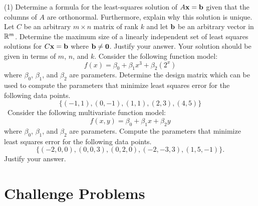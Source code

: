\begin{tasks}[resume, style=enumerate](1)
\task
  Determine a formula for the least-squares solution of $A\mathbf x = \mathbf b$
  given that the columns of $A$ are orthonormal.  Furthermore, explain
  why this solution is unique.
\task
  Let $C$ be an arbitrary $m \times n$ matrix of rank $k$ and let
  $\mathbf b$ be an arbitrary vector in $\mathbb R^m$.  Determine the maximum
  size of a linearly independent set of least squares solutions for
  $C\mathbf x = \mathbf b$ where $\mathbf b \not = \mathbf 0$.  Justify your
  answer.  Your solution should be given in terms of $m$, $n$, and
  $k$.
\task
  Consider the following function model:
  \begin{displaymath}
    f(x) = \beta_0 + \beta_1 x^3 + \beta_2 (2^x)
  \end{displaymath}
  where $\beta_0$, $\beta_1$, and $\beta_2$ are parameters.  Determine
  the design matrix which can be used to compute the parameters that
  minimize least squares error for the following data points.
  \begin{displaymath}
    \{(-1, 1), (0, -1), (1, 1), (2, 3), (4, 5)\}
  \end{displaymath}
\task
  \faCalculator \ Consider the following multivariate function model:
  \begin{displaymath}
    f(x,y) = \beta_0 + \beta_1 x + \beta_2 y
  \end{displaymath}
  where $\beta_0$, $\beta_1$, and $\beta_2$ are parameters.  Compute
  the parameters that minimize least squares error for the following
  data points.
  \begin{displaymath}
    \{(-2,0,0), (0,0,3), (0,2,0), (-2, -3, 3), (1,5,-1)\}.
  \end{displaymath}
  Justify your answer.
\end{tasks}

\section{Challenge Problems}

